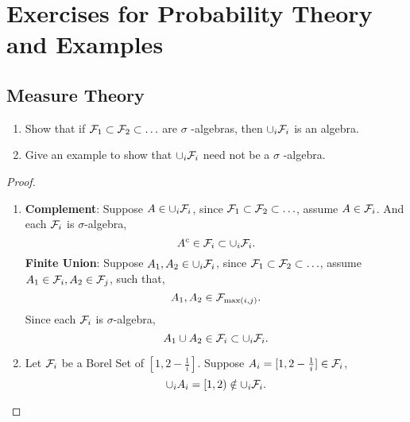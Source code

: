 \chapter{Exercises for Probability Theory and Examples}

\section{Measure Theory}

\begin{exercise}
	\begin{enumerate}
		\item Show that if \(\mathcal{F}_{1}\subset \mathcal{F}_{2}\subset\ldots\) are \(\sigma\) -algebras, then \(\cup_{i}\mathcal{F}_{i}\) is an algebra.
		\item Give an example to show that \(\cup_{i}\mathcal{F}_{i}\) need not be a \(\sigma\) -algebra.
	\end{enumerate}
\end{exercise}

\begin{proof}
	\begin{enumerate}
		\item
		      \textbf{Complement}: Suppose \(A\in\cup_{i}\mathcal{F}_{i}\), since \(\mathcal{F}_{1}\subset \mathcal{F}_{2}\subset\ldots\), assume \(A\in\mathcal{F}_{i}\). And each \(\mathcal{F}_{i}\) is \(\sigma\)-algebra,
		      \begin{equation*}
			      A^c\in\mathcal{F}_{i}\subset\cup_{i}\mathcal{F}_{i}.
		      \end{equation*}
		      \textbf{Finite Union}: Suppose \(A_1,A_2\in\cup_{i}\mathcal{F}_{i}\), since \(\mathcal{F}_{1}\subset \mathcal{F}_{2}\subset\ldots\), assume \(A_1\in\mathcal{F}_{i},A_2\in\mathcal{F}_{j}\), such that,
		      \begin{equation*}
			      A_1,A_2\in\mathcal{F}_{\max(i,j)}.
		      \end{equation*}
		      Since each \(\mathcal{F}_{i}\) is \(\sigma\)-algebra,
		      \begin{equation*}
			      A_1\cup A_2\in\mathcal{F}_{i}\subset\cup_{i}\mathcal{F}_{i}.
		      \end{equation*}
		\item
		      Let \(\mathcal{F}_{i}\) be a Borel Set of \([1,2-\frac{1}{i}]\). Suppose \(A_i=[1,2-\frac{1}{i}]\in\mathcal{F}_{i}\),
		      \begin{equation*}
			      \cup_{i}A_{i}=[1,2)\notin\cup_{i}\mathcal{F}_{i}.
		      \end{equation*}
	\end{enumerate}
\end{proof}

